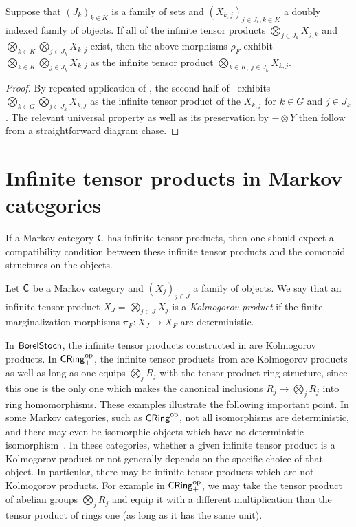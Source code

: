 \documentclass[11pt]{article}
\begin{document}
\begin{lemma}
	Suppose that $(J_k)_{k \in K}$ is a family of sets and $(X_{k,j})_{j \in J_k, k \in K}$ a doubly indexed family of objects. If all of the infinite tensor products $\bigotimes_{j \in J_k} X_{j,k}$ and $\bigotimes_{k \in K} \bigotimes_{j \in J_k} X_{k,j}$ exist, then the above morphisms $\rho_F$ exhibit $\bigotimes_{k \in K} \bigotimes_{j \in J_k} X_{k,j}$ as the infinite tensor product $\bigotimes_{k \in K, \: j \in J_k} X_{k,j}$.
\end{lemma}
\begin{proof}
	By repeated application of , the second half of~ exhibits $\bigotimes_{k \in G} \bigotimes_{j \in J_k} X_{k,j}$ as the infinite tensor product of the $X_{k,j}$ for $k \in G$ and $j \in J_k$. The relevant universal property as well as its preservation by $- \otimes Y$ then follow from a straightforward diagram chase.
\end{proof}

\section{Infinite tensor products in Markov categories}
\label{infprod_markov}

If a Markov category $\mathsf{C}$ has infinite tensor products, then one should expect a compatibility condition between these infinite tensor products and the comonoid structures on the objects. %

\begin{definition}
    \label{defn_kolmogorov_ext}
    Let $\mathsf{C}$ be a Markov category and $(X_j)_{j \in J}$ a family of objects. We say that an infinite tensor product $X_J = \bigotimes_{j \in J} X_j$ is a \emph{Kolmogorov product} if the finite marginalization morphisms $\pi_F : X_J \to X_F$ are deterministic.
\end{definition}

In $\operatorname{\mathsf{BorelStoch}}$, the infinite tensor products constructed in  are Kolmogorov products. In $\operatorname{\mathsf{CRing}}_+^{\mathrm{op}}$, the infinite tensor products from  are Kolmogorov products as well as long as one equips $\bigotimes_j R_j$ with the tensor product ring structure, since this one is the only one which makes the canonical inclusions $R_j \to \bigotimes_j R_j$ into ring homomorphisms. These examples illustrate the following important point. In some Markov categories, such as $\operatorname{\mathsf{CRing}}_+^{\mathrm{op}}$, not all isomorphisms are deterministic, and there may even be isomorphic objects which have no deterministic isomorphism~\cite[Remark~10.9]{markov_cats}. In these categories, whether a given infinite tensor product is a Kolmogorov product or not generally depends on the specific choice of that object. In particular, there may be infinite tensor products which are not Kolmogorov products. For example in $\operatorname{\mathsf{CRing}}_+^{\mathrm{op}}$, we may take the tensor product of abelian groups $\bigotimes_j R_j$ and equip it with a different multiplication than the tensor product of rings one (as long as it has the same unit).
\end{document}
